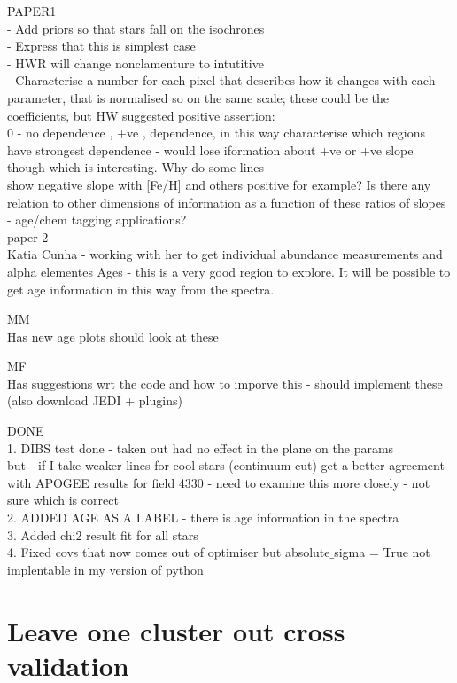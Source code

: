 \documentclass[12pt, preprint]{aastex}
\begin{document}
PAPER1 \\
- Add priors so that stars fall on the isochrones\\
- Express that this is simplest case\\
- HWR will change nonclamenture to intutitive\\
- Characterise a number for each pixel that describes how it changes with each parameter, that is normalised so on the same scale; these could be the coefficients, but HW suggested positive assertion:\\
0 - no dependence , +ve , dependence, in this way characterise which regions have strongest dependence - would lose iformation about +ve or +ve slope though which is interesting. Why do some lines\\
show negative slope with [Fe/H] and others positive for example? Is there any relation to other dimensions of information as a function of these ratios of slopes - age/chem tagging applications?\\

paper 2 \\
Katia Cunha - working with her to get individual abundance measurements and alpha elementes
Ages - this is a very good region to explore. It will be possible to get age information in this way from the spectra.

MM \\
Has new age plots should look at these

MF \\
Has suggestions wrt the code and how to imporve this - should implement these (also download JEDI + plugins)

DONE \\
1. DIBS test done - taken out had no effect in the plane on the params\\
but - if I take weaker lines for cool stars (continuum cut) get a better agreement with APOGEE results for field 4330 - need to examine this more closely - not sure which is correct\\
2. ADDED AGE AS A LABEL - there is age information in the spectra\\
3. Added chi2 result fit for all stars\\
4. Fixed covs that now comes out of optimiser but absolute$\_$sigma = True not implentable in my version of python\\



\section{Leave one cluster out cross validation}
\end{document}
